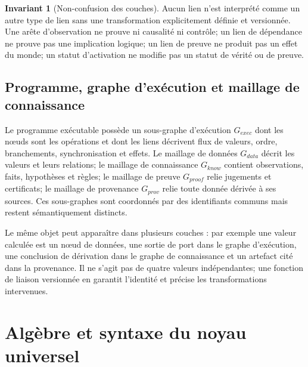 \documentclass[11pt,a4paper,openany]{book}
\theoremstyle{definition}
\newtheorem{invariant}[definition]{Invariant}
\theoremstyle{plain}
\theoremstyle{remark}
\begin{document}
\begin{invariant}[Non-confusion des couches]
Aucun lien n'est interprété comme un autre type de lien sans une transformation explicitement définie et versionnée. Une arête d'observation ne prouve ni causalité ni contrôle; un lien de dépendance ne prouve pas une implication logique; un lien de preuve ne produit pas un effet du monde; un statut d'activation ne modifie pas un statut de vérité ou de preuve.
\end{invariant}

\section{Programme, graphe d'exécution et maillage de connaissance}
Le programme exécutable possède un sous-graphe d'exécution $G_{exec}$ dont les nœuds sont les opérations et dont les liens décrivent flux de valeurs, ordre, branchements, synchronisation et effets. Le maillage de données $G_{data}$ décrit les valeurs et leurs relations; le maillage de connaissance $G_{know}$ contient observations, faits, hypothèses et règles; le maillage de preuve $G_{proof}$ relie jugements et certificats; le maillage de provenance $G_{prov}$ relie toute donnée dérivée à ses sources. Ces sous-graphes sont coordonnés par des identifiants communs mais restent sémantiquement distincts.

Le même objet peut apparaître dans plusieurs couches : par exemple une valeur calculée est un nœud de données, une sortie de port dans le graphe d'exécution, une conclusion de dérivation dans le graphe de connaissance et un artefact cité dans la provenance. Il ne s'agit pas de quatre valeurs indépendantes; une fonction de liaison versionnée en garantit l'identité et précise les transformations intervenues.

\chapter{Algèbre et syntaxe du noyau universel}
\end{document}
